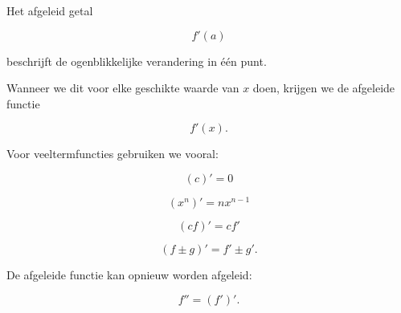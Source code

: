 \documentclass{ximera}
\begin{document}

Het afgeleid getal

\[
f'(a)
\]

beschrijft de ogenblikkelijke verandering in één punt.

Wanneer we dit voor elke geschikte waarde van $x$ doen,
krijgen we de afgeleide functie

\[
\boxed{
f'(x).
}
\]

Voor veeltermfuncties gebruiken we vooral:

\[
\boxed{
(c)'=0
}
\]

\[
\boxed{
(x^n)'=nx^{n-1}
}
\]

\[
\boxed{
(c f)'=c f'
}
\]

\[
\boxed{
(f\pm g)'=f'\pm g'.
}
\]

De afgeleide functie kan opnieuw worden afgeleid:

\[
\boxed{
f''=(f')'.
}
\]
\end{document}
